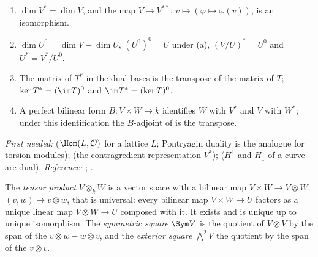 \begin{theorem}\label{thm:prereq:dual}
\begin{enumerate}[label=(\alph*)]
\item $\dim V^*=\dim V$, and the map $V\to V^{**}$, $v\mapsto(\varphi\mapsto\varphi(v))$, is an
isomorphism.
\item $\dim U^0=\dim V-\dim U$, $(U^0)^0=U$ under (a), $(V/U)^*=U^0$ and $U^*=V^*/U^0$.
\item The matrix of $T^*$ in the dual bases is the transpose of the matrix of $T$;
$\ker T^*=(\im T)^0$ and $\im T^*=(\ker T)^0$.
\item A perfect bilinear form $B\colon V\times W\to k$ identifies $W$ with $V^*$ and $V$ with $W^*$;
under this identification the $B$-adjoint of  is the transpose.
\end{enumerate}
\end{theorem}
\noindent\emph{First needed:}  ($\Hom(L,\mathcal O)$ for a lattice $L$; Pontryagin
duality is the analogue for torsion modules);  (the contragredient representation
$V^*$);  ($H^1$ and $H_1$ of a curve are dual). \emph{Reference:}
\cite[Chapter 3]{Axler15}; \cite{Halmos74}.

\begin{definition}\label{def:prereq:tensor}
The \emph{tensor product} $V\otimes_kW$ is a vector space with a bilinear map
$V\times W\to V\otimes W$, $(v,w)\mapsto v\otimes w$, that is universal: every bilinear map
$V\times W\to U$ factors as a unique linear map $V\otimes W\to U$ composed with it. It exists and is
unique up to unique isomorphism. The \emph{symmetric square} $\Sym V$ is the quotient of
$V\otimes V$ by the span of the $v\otimes w-w\otimes v$, and the \emph{exterior square}
$\bigwedge^2V$ the quotient by the span of the $v\otimes v$.
\end{definition}

